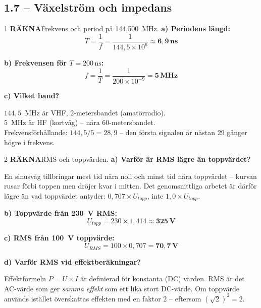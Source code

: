 \documentclass[a4paper,11pt,twoside]{book}
\newcommand{\qrakna}{\colorbox{bluepale}{\textcolor{bluedark}{\headingfont\bfseries\tiny RÄKNA}}}
\begin{document}
\subsection*{1.7 -- Växelström och impedans}

\begin{facitblock}{1}
\qrakna\quad Frekvens och period på 144,500~MHz.
\tcblower
\textbf{a) Periodens längd:}
\[ T = \frac{1}{f} = \frac{1}{144{,}5 \times 10^6} \approx \mathbf{6{,}9\,\text{ns}} \]

\textbf{b) Frekvensen för $T = 200\,\text{ns}$:}
\[ f = \frac{1}{T} = \frac{1}{200 \times 10^{-9}} = \mathbf{5\,\text{MHz}} \]

\textbf{c) Vilket band?}

$144{,}5$~MHz är VHF, 2-metersbandet (amatörradio).\\
$5$~MHz är HF (kortvåg) -- nära 60-metersbandet.\\
Frekvensförhållande: $144{,}5 / 5 = 28{,}9$ -- den 
första signalen är nästan 29 gånger högre i frekvens.
\end{facitblock}


\begin{facitblock}{2}
\qrakna\quad RMS och toppvärden.
\tcblower
\textbf{a) Varför är RMS lägre än toppvärdet?}

En sinusvåg tillbringar mest tid nära noll och minst
tid nära toppvärdet -- kurvan rusar förbi toppen men
dröjer kvar i mitten. Det genomsnittliga arbetet
är därför lägre än vad toppvärdet antyder:
$0{,}707 \times U_{topp}$, inte $1{,}0 \times U_{topp}$.

\textbf{b) Toppvärde från 230~V RMS:}
\[ U_{topp} = 230 \times 1{,}414 \approx \mathbf{325\,\text{V}} \]

\textbf{c) RMS från 100~V toppvärde:}
\[ U_{RMS} = 100 \times 0{,}707 = \mathbf{70{,}7\,\text{V}} \]

\textbf{d) Varför RMS vid effektberäkningar?}

Effektformeln $P = U \times I$ är definierad för
konstanta (DC) värden. RMS är det AC-värde som ger
\emph{samma effekt} som ett lika stort DC-värde.
Om toppvärde används istället överskattas effekten
med en faktor 2 -- eftersom $(\sqrt{2})^2 = 2$.
\end{facitblock}
\end{document}
